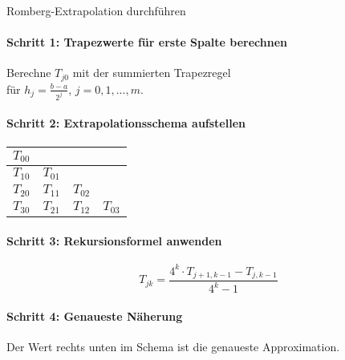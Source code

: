 \begin{KR}{Romberg-Extrapolation durchführen}
\paragraph{Schritt 1: Trapezwerte für erste Spalte berechnen}
Berechne $T_{j0}$ mit der summierten Trapezregel\\ für $h_j = \frac{b-a}{2^j}$, $j = 0, 1, ..., m$.

\paragraph{Schritt 2: Extrapolationsschema aufstellen}
\begin{center}
\begin{tabular}{|c|c|c|c|}
\hline
$T_{00}$ & & & \\
\hline
$T_{10}$ & $T_{01}$ & & \\
\hline
$T_{20}$ & $T_{11}$ & $T_{02}$ & \\
\hline
$T_{30}$ & $T_{21}$ & $T_{12}$ & $T_{03}$ \\
\hline
\end{tabular}
\end{center}

\paragraph{Schritt 3: Rekursionsformel anwenden}
$$T_{jk} = \frac{4^k \cdot T_{j+1,k-1} - T_{j,k-1}}{4^k - 1}$$

\paragraph{Schritt 4: Genaueste Näherung}
Der Wert rechts unten im Schema ist die genaueste Approximation.
\end{KR}

